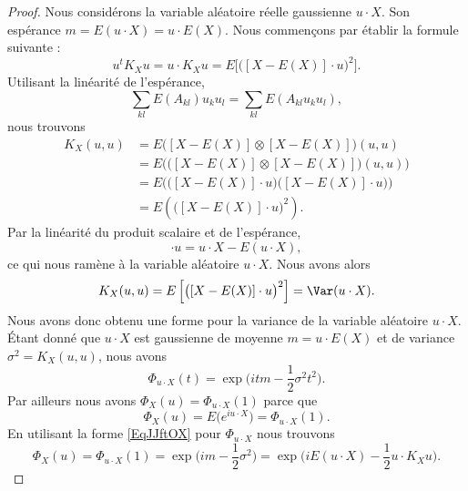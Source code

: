 \begin{proof}
	Nous considérons la variable aléatoire réelle gaussienne \( u\cdot X\). Son espérance \( m=E(u\cdot X)=u\cdot E(X)\). Nous commençons par établir la formule suivante :
	\begin{equation}
		u^tK_Xu=u\cdot K_Xu=E\Big[ \big( [X-E(X)]\cdot u \big)^2 \Big].
	\end{equation}
	Utilisant la linéarité de l'espérance,
	\begin{equation}
		\sum_{kl}E(A_{kl})u_ku_l=\sum_{kl}E(A_{kl}u_ku_l),
	\end{equation}
	nous trouvons
	\begin{subequations}
		\begin{align}
			K_X(u,u) & =E\Big( [X-E(X)]\otimes [X-E(X)] \Big)(u,u)                          \\
			         & =E\Big( \big( [X-E(X)]\otimes [X-E(X)] \big)(u,u) \Big)              \\
			         & =E\Big( \big( [X-E(X)]\cdot u \big)\big( [X-E(X)]\cdot u \big) \Big) \\
			         & =E\left( \big( [X-E(X)]\cdot u \big)^2 \right).
		\end{align}
	\end{subequations}
	Par la linéarité du produit scalaire et de l'espérance,
	\begin{equation}
		[X-E(X)]\cdot u=u\cdot X-E(u\cdot X),
	\end{equation}
	ce qui nous ramène à la variable aléatoire \( u\cdot X\). Nous avons alors
	\begin{subequations}
		\begin{align}
			K_X(u,u)=E\left[ \big( [X-E(X)]\cdot u \big)^2 \right]=\Var(u\cdot X).
		\end{align}
	\end{subequations}
	Nous avons donc obtenu une forme pour la variance de la variable aléatoire \( u\cdot X\). Étant donné que \( u\cdot X\) est gaussienne de moyenne \( m=u\cdot E(X)\) et de variance \( \sigma^2=K_X(u,u)\), nous avons
	\begin{equation}    \label{EqJJftOX}
		\Phi_{u\cdot X}(t)=\exp\big( itm-\frac{ 1 }{2}\sigma^2t^2 \big).
	\end{equation}
	Par ailleurs nous avons \( \Phi_X(u)=\Phi_{u\cdot X}(1)\) parce que
	\begin{equation}
		\Phi_X(u)=E\big(  e^{iu\cdot X} \big)=\Phi_{u\cdot X}(1).
	\end{equation}
	En utilisant la forme \eqref{EqJJftOX} pour \( \Phi_{u\cdot X}\) nous trouvons
	\begin{equation}
		\Phi_X(u)=\Phi_{u\cdot X}(1)=\exp\big( im-\frac{ 1 }{2}\sigma^2 \big)=\exp\Big( iE(u\cdot X)-\frac{ 1 }{2}u\cdot K_Xu \Big).
	\end{equation}
\end{proof}

